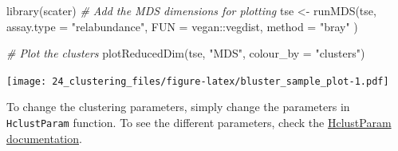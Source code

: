 \documentclass[
]{book}
\newenvironment{Shaded}{\begin{snugshade}}{\end{snugshade}}
\newcommand{\AttributeTok}[1]{\textcolor[rgb]{0.77,0.63,0.00}{#1}}
\newcommand{\CommentTok}[1]{\textcolor[rgb]{0.56,0.35,0.01}{\textit{#1}}}
\newcommand{\ConstantTok}[1]{\textcolor[rgb]{0.00,0.00,0.00}{#1}}
\newcommand{\FunctionTok}[1]{\textcolor[rgb]{0.00,0.00,0.00}{#1}}
\newcommand{\NormalTok}[1]{#1}
\newcommand{\OtherTok}[1]{\textcolor[rgb]{0.56,0.35,0.01}{#1}}
\newcommand{\SpecialCharTok}[1]{\textcolor[rgb]{0.00,0.00,0.00}{#1}}
\newcommand{\StringTok}[1]{\textcolor[rgb]{0.31,0.60,0.02}{#1}}
\begin{document}
\begin{Shaded}
\begin{Highlighting}[]
\FunctionTok{library}\NormalTok{(scater)}
\CommentTok{\# Add the MDS dimensions for plotting}
\NormalTok{tse }\OtherTok{\textless{}{-}} \FunctionTok{runMDS}\NormalTok{(tse,}
  \AttributeTok{assay.type =} \StringTok{"relabundance"}\NormalTok{,}
  \AttributeTok{FUN =}\NormalTok{ vegan}\SpecialCharTok{::}\NormalTok{vegdist,}
  \AttributeTok{method =} \StringTok{"bray"}
\NormalTok{)}

\CommentTok{\# Plot the clusters}
\FunctionTok{plotReducedDim}\NormalTok{(tse, }\StringTok{"MDS"}\NormalTok{, }\AttributeTok{colour\_by =} \StringTok{"clusters"}\NormalTok{)}
\end{Highlighting}
\end{Shaded}

\texttt{[image: 24\_clustering\_files/figure-latex/bluster\_sample\_plot-1.pdf]}

To change the clustering parameters, simply change the parameters in
\texttt{HclustParam} function. To see the different parameters, check the
\href{https://rdrr.io/github/LTLA/bluster/man/HclustParam-class.html}{HclustParam documentation}.

\begin{Shaded}
\end{Shaded}
\end{document}
